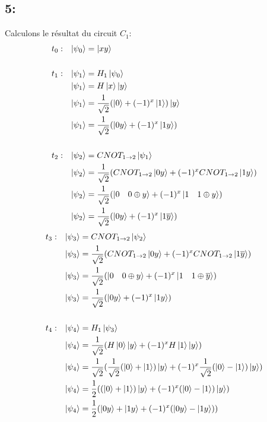 \documentclass{article}
\begin{document}
\subsection*{5:}
Calculons le résultat du circuit $C_1$:
\begin{align*}
&t_0:&  \ket{\psi_0} &= \ket{xy} \\ \\
&t_1:&  \ket{\psi_1} &= H_1\ket{\psi_0} \\
&&      \ket{\psi_1} &= H\ket{x}\ket{y} \\
&&      \ket{\psi_1} &= \frac{1}{\sqrt{2}}(\ket{0} + (-1)^x\ket{1})\ket{y} \\
&&      \ket{\psi_1} &= \frac{1}{\sqrt{2}}(\ket{0y} + (-1)^x\ket{1y}) \\ \\
&t_2:&  \ket{\psi_2} &= CNOT_{1 \rightarrow 2}\ket{\psi_1} \\
&&      \ket{\psi_2} &= \frac{1}{\sqrt{2}}(CNOT_{1 \rightarrow 2}\ket{0y} + (-1)^xCNOT_{1 \rightarrow 2}\ket{1y}) \\
&&      \ket{\psi_2} &= \frac{1}{\sqrt{2}}(\ket{0 \quad 0 \oplus y} + (-1)^x\ket{1 \quad 1 \oplus y}) \\
&&      \ket{\psi_2} &= \frac{1}{\sqrt{2}}(\ket{0y} + (-1)^x\ket{1\overline{y}}) \\
\end{align*}
\begin{align*}
&t_3:&  \ket{\psi_3} &= CNOT_{1 \rightarrow 2}\ket{\psi_2} \\
&&      \ket{\psi_3} &= \frac{1}{\sqrt{2}}(CNOT_{1 \rightarrow 2}\ket{0y} + (-1)^xCNOT_{1 \rightarrow 2}\ket{1\overline{y}}) \\
&&      \ket{\psi_3} &= \frac{1}{\sqrt{2}}(\ket{0 \quad 0 \oplus y} + (-1)^x\ket{1 \quad 1 \oplus \overline{y}}) \\
&&      \ket{\psi_3} &= \frac{1}{\sqrt{2}}(\ket{0y} + (-1)^x\ket{1y}) \\ \\
&t_4:&  \ket{\psi_4} &= H_1\ket{\psi_3} \\
&&      \ket{\psi_4} &= \frac{1}{\sqrt{2}}(H\ket{0}\ket{y} + (-1)^xH\ket{1}\ket{y}) \\
&&      \ket{\psi_4} &= \frac{1}{\sqrt{2}}(\frac{1}{\sqrt{2}}(\ket{0} + \ket{1})\ket{y} + (-1)^x\frac{1}{\sqrt{2}}(\ket{0} - \ket{1})\ket{y}) \\
&&      \ket{\psi_4} &= \frac{1}{2}((\ket{0} + \ket{1})\ket{y} + (-1)^x(\ket{0} - \ket{1})\ket{y}) \\
&&      \ket{\psi_4} &= \frac{1}{2}(\ket{0y} + \ket{1y} + (-1)^x(\ket{0y} - \ket{1y})) \\
\end{align*}
\end{document}
